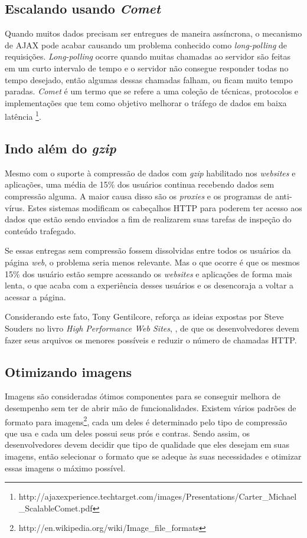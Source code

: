 \subsection{Escalando usando \textit{Comet}}
\label{subsec:evenfaster_cap8}
Quando muitos dados precisam ser entregues de maneira assíncrona, o mecanismo de AJAX pode acabar causando um problema conhecido como \textit{long-polling} de requisições. \textit{Long-polling} ocorre quando muitas chamadas ao servidor são feitas em um curto intervalo de tempo e o servidor não consegue responder todas no tempo desejado, então algumas dessas chamadas falham, ou ficam muito tempo paradas. \textit{Comet} é um termo que se refere a uma coleção de técnicas, protocolos e implementações que tem como objetivo melhorar o tráfego de dados em baixa latência \footnote{http://ajaxexperience.techtarget.com/images/Presentations/Carter\_Michael\_ScalableComet.pdf}.

\subsection{Indo além do \textit{gzip}}
\label{subsec:evenfaster_cap9}
Mesmo com o suporte à compressão de dados com \textit{gzip} habilitado nos \textit{websites} e aplicações, uma média de 15\% dos usuários continua recebendo dados sem compressão alguma. A maior causa disso são os \textit{proxies} e os programas de anti-vírus. Estes sistemas modificam os cabeçalhos HTTP para poderem ter acesso aos dados que estão sendo enviados a fim de realizarem suas tarefas de inspeção do conteúdo trafegado.

Se essas entregas sem compressão fossem dissolvidas entre todos os usuários da página \textit{web}, o problema seria menos relevante. Mas o que ocorre é que os mesmos 15\% dos usuário estão sempre acessando os \textit{websites} e aplicações de forma mais lenta, o que acaba com a experiência desses usuários e os desencoraja a voltar a acessar a página.

Considerando este fato, Tony Gentilcore, reforça as ideias expostas por Steve Souders no livro \textit{High Performance Web Sites}, \cite{HighPerformance}, de que os desenvolvedores devem fazer seus arquivos os menores possíveis e reduzir o número de chamadas HTTP.

\subsection{Otimizando imagens}
\label{subsec:evenfaster_cap10}
Imagens são consideradas ótimos componentes para se conseguir melhora de desempenho sem ter de abrir mão de funcionalidades. Existem vários padrões de formato para imagens\footnote{http://en.wikipedia.org/wiki/Image\_file\_formats}, cada um deles é determinado pelo tipo de compressão que usa e cada um deles possui seus prós e contras. Sendo assim, os desenvolvedores devem decidir que tipo de qualidade que eles desejam em suas imagens, então selecionar o formato que se adeque às suas necessidades e otimizar essas imagens o máximo possível.

